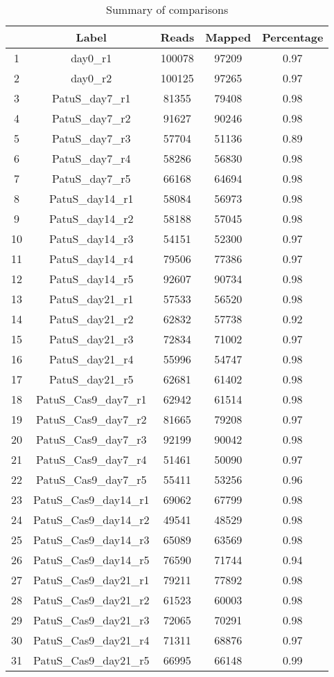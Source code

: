 \documentclass{article}
\begin{document}
\begin{table}[ht]
\centering
\begin{tabular}{ccccc}
  \hline
 & Label & Reads & Mapped & Percentage \\ 
  \hline
1 & day0\_r1 & 100078 & 97209 & 0.97 \\ 
  2 & day0\_r2 & 100125 & 97265 & 0.97 \\ 
  3 & PatuS\_day7\_r1 & 81355 & 79408 & 0.98 \\ 
  4 & PatuS\_day7\_r2 & 91627 & 90246 & 0.98 \\ 
  5 & PatuS\_day7\_r3 & 57704 & 51136 & 0.89 \\ 
  6 & PatuS\_day7\_r4 & 58286 & 56830 & 0.98 \\ 
  7 & PatuS\_day7\_r5 & 66168 & 64694 & 0.98 \\ 
  8 & PatuS\_day14\_r1 & 58084 & 56973 & 0.98 \\ 
  9 & PatuS\_day14\_r2 & 58188 & 57045 & 0.98 \\ 
  10 & PatuS\_day14\_r3 & 54151 & 52300 & 0.97 \\ 
  11 & PatuS\_day14\_r4 & 79506 & 77386 & 0.97 \\ 
  12 & PatuS\_day14\_r5 & 92607 & 90734 & 0.98 \\ 
  13 & PatuS\_day21\_r1 & 57533 & 56520 & 0.98 \\ 
  14 & PatuS\_day21\_r2 & 62832 & 57738 & 0.92 \\ 
  15 & PatuS\_day21\_r3 & 72834 & 71002 & 0.97 \\ 
  16 & PatuS\_day21\_r4 & 55996 & 54747 & 0.98 \\ 
  17 & PatuS\_day21\_r5 & 62681 & 61402 & 0.98 \\ 
  18 & PatuS\_Cas9\_day7\_r1 & 62942 & 61514 & 0.98 \\ 
  19 & PatuS\_Cas9\_day7\_r2 & 81665 & 79208 & 0.97 \\ 
  20 & PatuS\_Cas9\_day7\_r3 & 92199 & 90042 & 0.98 \\ 
  21 & PatuS\_Cas9\_day7\_r4 & 51461 & 50090 & 0.97 \\ 
  22 & PatuS\_Cas9\_day7\_r5 & 55411 & 53256 & 0.96 \\ 
  23 & PatuS\_Cas9\_day14\_r1 & 69062 & 67799 & 0.98 \\ 
  24 & PatuS\_Cas9\_day14\_r2 & 49541 & 48529 & 0.98 \\ 
  25 & PatuS\_Cas9\_day14\_r3 & 65089 & 63569 & 0.98 \\ 
  26 & PatuS\_Cas9\_day14\_r5 & 76590 & 71744 & 0.94 \\ 
  27 & PatuS\_Cas9\_day21\_r1 & 79211 & 77892 & 0.98 \\ 
  28 & PatuS\_Cas9\_day21\_r2 & 61523 & 60003 & 0.98 \\ 
  29 & PatuS\_Cas9\_day21\_r3 & 72065 & 70291 & 0.98 \\ 
  30 & PatuS\_Cas9\_day21\_r4 & 71311 & 68876 & 0.97 \\ 
  31 & PatuS\_Cas9\_day21\_r5 & 66995 & 66148 & 0.99 \\ 
   \hline
\end{tabular}
\caption{Summary of comparisons} 
\label{tab:one}
\end{table}
\end{document}

